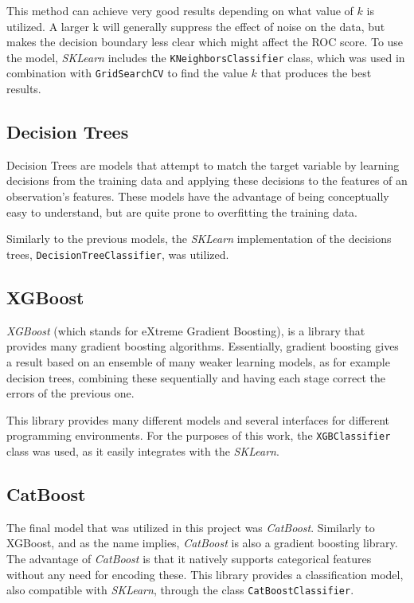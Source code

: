 \documentclass{IEEEtran}
\begin{document}
This method can achieve very good results depending on what value of $k$ is utilized. A larger k will generally suppress the effect of noise on the data, but makes the decision boundary less clear which might affect the ROC score. To use the model, \textit{SKLearn} includes the \texttt{KNeighborsClassifier} class, which was used in combination with \texttt{GridSearchCV} to find the value $k$ that produces the best results.

\subsection{Decision Trees}

Decision Trees are models that attempt to match the target variable by learning decisions from the training data and applying these decisions to the features of an observation's features. These models have the advantage of being conceptually easy to understand, but are quite prone to overfitting the training data.

Similarly to the previous models, the \textit{SKLearn} implementation of the decisions trees, \texttt{DecisionTreeClassifier}, was utilized.

\subsection{XGBoost}

\textit{XGBoost} (which stands for eXtreme Gradient Boosting), is a library that provides many gradient boosting algorithms. Essentially, gradient boosting gives a result based on an ensemble of many weaker learning models, as for example decision trees, combining these sequentially and having each stage correct the errors of the previous one.

This library provides many different models and several interfaces for different programming environments. For the purposes of this work, the \texttt{XGBClassifier} class was used, as it easily integrates with the \textit{SKLearn}.

\subsection{CatBoost}

The final model that was utilized in this project was \textit{CatBoost}. Similarly to XGBoost, and as the name implies, \textit{CatBoost} is also a gradient boosting library. The advantage of \textit{CatBoost} is that it natively supports categorical features without any need for encoding these. This library provides a classification model, also compatible with \textit{SKLearn}, through the class \texttt{CatBoostClassifier}.
\end{document}
